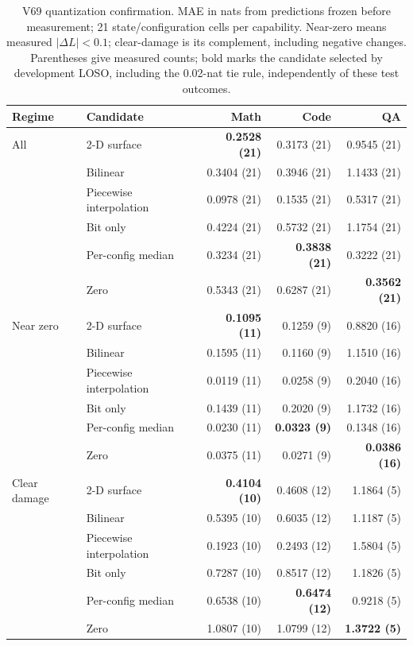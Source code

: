 \begin{table}[H]
\centering
\small
\caption{V69 quantization confirmation. MAE in nats from predictions frozen before measurement; 21 state/configuration cells per capability. Near-zero means measured $|\Delta L|<0.1$; clear-damage is its complement, including negative changes. Parentheses give measured counts; bold marks the candidate selected by development LOSO, including the 0.02-nat tie rule, independently of these test outcomes.}
\label{tab:quant_confirm}
\begin{tabular}{@{}llrrr@{}}
\toprule
Regime & Candidate & Math & Code & QA \\
\midrule
All & 2-D surface & \textbf{0.2528 (21)} & 0.3173 (21) & 0.9545 (21) \\
 & Bilinear & 0.3404 (21) & 0.3946 (21) & 1.1433 (21) \\
 & Piecewise interpolation & 0.0978 (21) & 0.1535 (21) & 0.5317 (21) \\
 & Bit only & 0.4224 (21) & 0.5732 (21) & 1.1754 (21) \\
 & Per-config median & 0.3234 (21) & \textbf{0.3838 (21)} & 0.3222 (21) \\
 & Zero & 0.5343 (21) & 0.6287 (21) & \textbf{0.3562 (21)} \\
\addlinespace
Near zero & 2-D surface & \textbf{0.1095 (11)} & 0.1259 (9) & 0.8820 (16) \\
 & Bilinear & 0.1595 (11) & 0.1160 (9) & 1.1510 (16) \\
 & Piecewise interpolation & 0.0119 (11) & 0.0258 (9) & 0.2040 (16) \\
 & Bit only & 0.1439 (11) & 0.2020 (9) & 1.1732 (16) \\
 & Per-config median & 0.0230 (11) & \textbf{0.0323 (9)} & 0.1348 (16) \\
 & Zero & 0.0375 (11) & 0.0271 (9) & \textbf{0.0386 (16)} \\
\addlinespace
Clear damage & 2-D surface & \textbf{0.4104 (10)} & 0.4608 (12) & 1.1864 (5) \\
 & Bilinear & 0.5395 (10) & 0.6035 (12) & 1.1187 (5) \\
 & Piecewise interpolation & 0.1923 (10) & 0.2493 (12) & 1.5804 (5) \\
 & Bit only & 0.7287 (10) & 0.8517 (12) & 1.1826 (5) \\
 & Per-config median & 0.6538 (10) & \textbf{0.6474 (12)} & 0.9218 (5) \\
 & Zero & 1.0807 (10) & 1.0799 (12) & \textbf{1.3722 (5)} \\
\bottomrule
\end{tabular}
\end{table}
